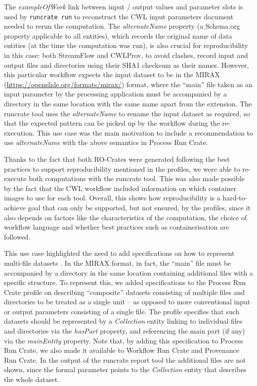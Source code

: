 \documentclass[10pt,letterpaper]{article}
\begin{document}
\begin{figure}
\begin{adjustwidth}{-0.5cm}{0in}
\end{adjustwidth}
\end{figure}


The \emph{exampleOfWork} link between input / output values and parameter slots is used by \texttt{runcrate run} to reconstruct the CWL input parameters document needed to rerun the computation.
The
\emph{alternateName} property (a Schema.org property applicable to all entities), which records the original name of data entities (at the time the computation was run), is also crucial for reproducibility in this case: both StreamFlow and CWLProv, to avoid clashes, record input and output files and directories using their SHA1
checksum as their names. 
However, this particular workflow expects the input dataset to be in the MIRAX (\url{https://openslide.org/formats/mirax/}) format, where the ``main'' file taken as an input parameter by the processing application must be accompanied by a directory in the same location with the same name apart from the extension.
The runcrate tool uses the \emph{alternateName} to rename the input dataset as required, so that the expected pattern can be picked up by the workflow during the re-execution.
This use case was the main motivation to include a recommendation to use \emph{alternateName} with the above semantics in Process Run Crate.

Thanks to the fact that both RO-Crates were generated following the best practices to support reproducibility mentioned in the profiles, we were able to re-execute both computations with the runcrate tool.
This was also made possible by the fact that the CWL workflow included information on which container images to use for each tool.
Overall, this shows how reproducibility is a hard-to-achieve goal that can only be supported, but not ensured, by the profiles, since it also depends on factors like the characteristics of the computation, the choice of workflow language and whether best practices such as containerisation are followed.

This use case highlighted the need to add specifications on how to represent multi-file datasets \cite[section Representing multi-file objects]{WRROC 2023a}. In the MIRAX format, in fact, the ``main'' file must be accompanied by a directory in the same location containing additional files with a specific structure.
To represent this, we added specifications to the Process Run Crate profile on describing “composite” datasets consisting of multiple files and directories to be treated as a single unit -- as opposed to more conventional input or output parameters consisting of a single file. The profile specifies that such datasets should be represented by a \emph{Collection} entity linking to individual files and directories via the \emph{hasPart} property, and referencing the main part (if any) via the \emph{mainEntity} property. Note that, by adding this specification to Process Run Crate, we also made it available to Workflow Run Crate and Provenance Run Crate. In the output of the runcrate report tool the additional files are not shown, since the formal parameter points to the \emph{Collection} entity that describes the whole dataset.
\end{document}
